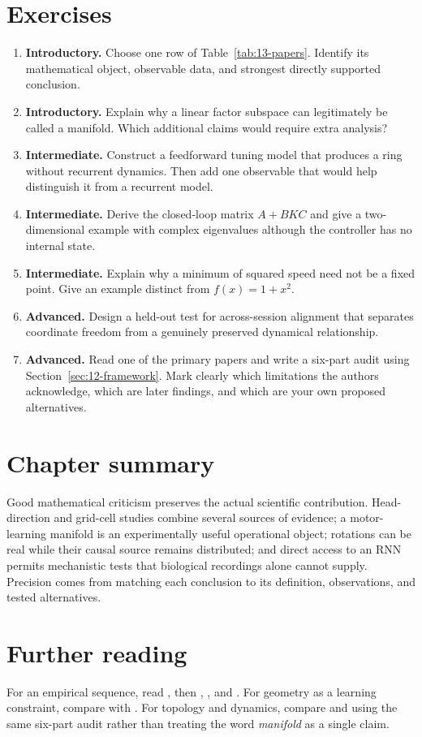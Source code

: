 \section*{Exercises}
\begin{enumerate}
\item \textbf{Introductory.} Choose one row of Table~\ref{tab:13-papers}. Identify its mathematical object, observable data, and strongest directly supported conclusion.
\item \textbf{Introductory.} Explain why a linear factor subspace can legitimately be called a manifold. Which additional claims would require extra analysis?
\item \textbf{Intermediate.} Construct a feedforward tuning model that produces a ring without recurrent dynamics. Then add one observable that would help distinguish it from a recurrent model.
\item \textbf{Intermediate.} Derive the closed-loop matrix \(A+BKC\) and give a two-dimensional example with complex eigenvalues although the controller has no internal state.
\item \textbf{Intermediate.} Explain why a minimum of squared speed need not be a fixed point. Give an example distinct from \(f(x)=1+x^2\).
\item \textbf{Advanced.} Design a held-out test for across-session alignment that separates coordinate freedom from a genuinely preserved dynamical relationship.
\item \textbf{Advanced.} Read one of the primary papers and write a six-part audit using Section~\ref{sec:12-framework}. Mark clearly which limitations the authors acknowledge, which are later findings, and which are your own proposed alternatives.
\end{enumerate}

\section*{Chapter summary}
Good mathematical criticism preserves the actual scientific contribution. Head-direction and grid-cell studies combine several sources of evidence; a motor-learning manifold is an experimentally useful operational object; rotations can be real while their causal source remains distributed; and direct access to an RNN permits mechanistic tests that biological recordings alone cannot supply. Precision comes from matching each conclusion to its definition, observations, and tested alternatives.

\section*{Further reading}
For an empirical sequence, read \citet{app_churchland2012}, then \citet{ev_elsayed2017}, \citet{ev_kalidindi2021}, and \citet{ev_sabatini2024}. For geometry as a learning constraint, compare \citet{app_sadtler2014} with \citet{ev_oby2019}. For topology and dynamics, compare \citet{app_chaudhuri2019} and \citet{app_gardner2022} using the same six-part audit rather than treating the word \emph{manifold} as a single claim.
